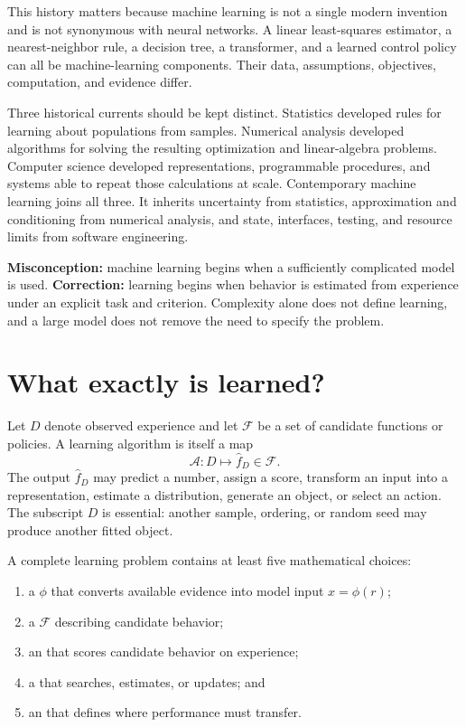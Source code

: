 This history matters because machine learning is not a single modern invention
and is not synonymous with neural networks. A linear least-squares estimator,
a nearest-neighbor rule, a decision tree, a transformer, and a learned control
policy can all be machine-learning components. Their data, assumptions,
objectives, computation, and evidence differ.

Three historical currents should be kept distinct. Statistics developed rules
for learning about populations from samples. Numerical analysis developed
algorithms for solving the resulting optimization and linear-algebra problems.
Computer science developed representations, programmable procedures, and
systems able to repeat those calculations at scale. Contemporary machine
learning joins all three. It inherits uncertainty from statistics, approximation
and conditioning from numerical analysis, and state, interfaces, testing, and
resource limits from software engineering.

\begin{misconceptionbox}
\textbf{Misconception:} machine learning begins when a sufficiently complicated
model is used. \textbf{Correction:} learning begins when behavior is estimated
from experience under an explicit task and criterion. Complexity alone does
not define learning, and a large model does not remove the need to specify the
problem.
\end{misconceptionbox}

\section{What exactly is learned?}

Let $D$ denote observed experience and let $\mathcal{F}$ be a set of candidate
functions or policies. A learning algorithm is itself a map
\[
\mathcal{A}:D\longmapsto \widehat f_D\in\mathcal{F}.
\]
The output $\widehat f_D$ may predict a number, assign a score, transform an
input into a representation, estimate a distribution, generate an object, or
select an action. The subscript $D$ is essential: another sample, ordering, or
random seed may produce another fitted object.

A complete learning problem contains at least five mathematical choices:

\begin{enumerate}
  \item a  $\phi$ that converts available evidence into
  model input $x=\phi(r)$;
  \item a  $\mathcal{F}$ describing candidate behavior;
  \item an  that scores candidate behavior on experience;
  \item a  that searches, estimates, or updates; and
  \item an  that defines where performance must
  transfer.
\end{enumerate}

